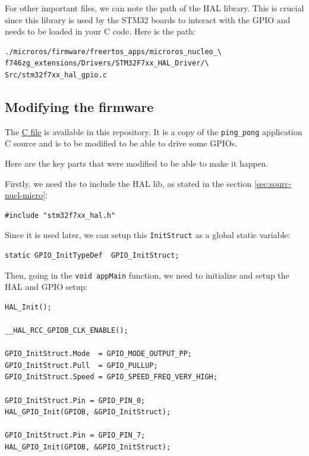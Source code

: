 \documentclass[10pt]{article}
\begin{document}
For other important files, we can note the path of the HAL library. This is crucial since this library is used by the STM32 boards to interact with the GPIO and needs to be loaded in your C code. Here is the path:
\begin{tcolorbox}
\begin{verbatim}
./microros/firmware/freertos_apps/microros_nucleo_\
f746zg_extensions/Drivers/STM32F7xx_HAL_Driver/\
Src/stm32f7xx_hal_gpio.c
\end{verbatim}
\end{tcolorbox}

\subsection{Modifying the firmware}
\label{sec:modifying-firmware}
The \href{https://gitlab.com/nucleo-144/documentation/-/blob/main/src/ping_pong.c}{C file} is available in this repository. It is a copy of the \verb|ping_pong| application C source and is to be modified to be able to drive some GPIOs.

Here are the key parts that were modified to be able to make it happen.

Firstly, we need the to include the HAL lib, as stated in the section \ref{sec:sourc-nucl-micro}:
\begin{tcolorbox}
\begin{verbatim}
#include "stm32f7xx_hal.h"
\end{verbatim}
\end{tcolorbox}

Since it is used later, we can setup this \verb|InitStruct| as a global static variable:
\begin{tcolorbox}
\begin{verbatim}
static GPIO_InitTypeDef  GPIO_InitStruct;
\end{verbatim}
\end{tcolorbox}

Then, going in the \verb|void appMain| function, we need to initialize and setup the HAL and GPIO setup:
\begin{tcolorbox}
\begin{verbatim}
HAL_Init();

__HAL_RCC_GPIOB_CLK_ENABLE();

GPIO_InitStruct.Mode  = GPIO_MODE_OUTPUT_PP;
GPIO_InitStruct.Pull  = GPIO_PULLUP;
GPIO_InitStruct.Speed = GPIO_SPEED_FREQ_VERY_HIGH;

GPIO_InitStruct.Pin = GPIO_PIN_0;
HAL_GPIO_Init(GPIOB, &GPIO_InitStruct);

GPIO_InitStruct.Pin = GPIO_PIN_7;
HAL_GPIO_Init(GPIOB, &GPIO_InitStruct);
\end{verbatim}
\end{tcolorbox}
\end{document}
